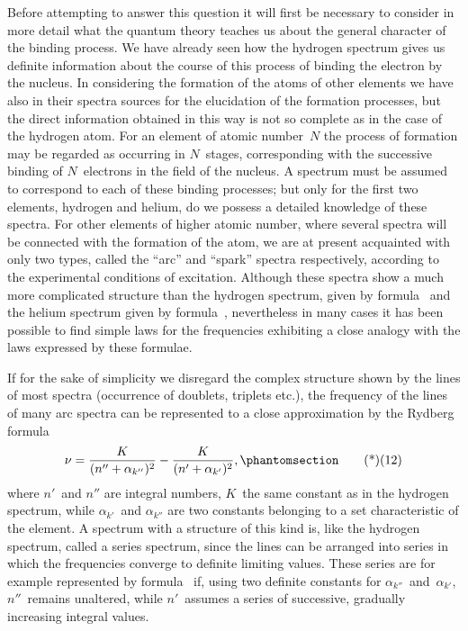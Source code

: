 Before attempting to answer this question it will first be
necessary to consider in more detail what the quantum theory
teaches us about the general character of the binding process. We
have already seen how the hydrogen spectrum gives us definite
information about the course of this process of binding the electron
by the nucleus. In considering the formation of the atoms of other
elements we have also in their spectra sources for the elucidation
of the formation processes, but the direct information obtained in
this way is not so complete as in the case of the hydrogen atom.
For an element of atomic number~$N$ the process of formation may
be regarded as occurring in $N$~stages, corresponding with the successive
binding of $N$~electrons in the field of the nucleus. A spectrum
must be assumed to correspond to each of these binding processes;
but only for the first two elements, hydrogen and helium, do we
possess a detailed knowledge of these spectra. For other elements
of higher atomic number, where several spectra will be connected
with the formation of the atom, we are at present acquainted with
only two types, called the ``arc'' and ``spark'' spectra respectively,
according to the experimental conditions of excitation. Although
these spectra show a much more complicated structure than the
hydrogen spectrum, given by formula~ and the helium spectrum
given by formula~, nevertheless in many cases it has been
possible to find simple laws for the frequencies exhibiting a close
analogy with the laws expressed by these formulae.

 If for the sake of simplicity we disregard
the complex structure shown by the lines of most spectra
(occurrence of doublets, triplets etc.), the frequency of the lines of
many arc spectra can be represented to a close approximation by
the Rydberg formula
\[
\nu = \frac{K}{(n'' + \alpha_{k''})^{2}} - \frac{K}{(n' + \alpha_{k'})^{2}},
\Tag{(12)}
\]
where $n'$~and $n''$ are integral numbers, $K$~the same constant as in
the hydrogen spectrum, while $\alpha_{k'}$~and $\alpha_{k''}$ are two constants belonging
to a set characteristic of the element. A spectrum with a
structure of this kind is, like the hydrogen spectrum, called a series
spectrum, since the lines can be arranged into series in which the
frequencies converge to definite limiting values. These series are
for example represented by formula~ if, using two definite
constants for $\alpha_{k''}$~and~$\alpha_{k'}$, $n''$~remains unaltered, while $n'$~assumes a
series of successive, gradually increasing integral values.

